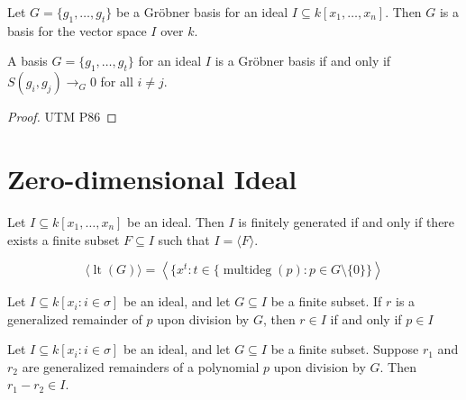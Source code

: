 \begin{lemma}\label{groebner_basis_is_basis}
  Let \( G = \{g_1, \ldots, g_t\} \) be a Gröbner basis for an ideal \( I \subseteq k[x_1, \ldots, x_n] \). Then \( G \) is a basis for the vector space \( I \) over \( k \).
\end{lemma}

\begin{lemma}\label{Buchberger Criteria}
A basis \( G = \{ g_1, \ldots, g_t \} \) for an ideal \( I \) is a Gröbner basis if and only if \( S(g_i, g_j) \to_G 0 \) for all \( i \neq j \).
\end{lemma}
\begin{proof}
 UTM P86
\end{proof}

\section{Zero-dimensional Ideal}\label{Zero-dimensional Ideal}
\begin{lemma}\label{fg_span_iff_fg_span_finset_subset}
  Let \( I \subseteq k[x_1, \ldots, x_n] \) be an ideal. Then \( I \) is finitely generated if and only if there exists a finite subset \( F \subseteq I \) such that \( I = \langle F \rangle \).
\end{lemma}

\begin{lemma}\label{leadingTerm_ideal_span_monomial}
  \leanok
  \[
  \langle \operatorname{lt}(G) \rangle = \left\langle \{ x^t : t \in \{ \operatorname{multideg}(p) : p \in G \setminus \{0\} \} \right\rangle
  \]
\end{lemma}

\begin{lemma}\label{remainder_mem_ideal_iff}
  Let \( I \subseteq k[x_i : i \in \sigma] \) be an ideal, and let \( G \subseteq I \) be a finite subset.
  If \( r \) is a generalized remainder of \( p \) upon division by \( G \),
  then \( r \in I \) if and only if \( p \in I \)
\end{lemma}

\begin{lemma}\label{remainder_sub_remainder_mem_ideal}
  Let \( I \subseteq k[x_i : i \in \sigma] \) be an ideal, and let \( G \subseteq I \) be a finite subset.
  Suppose \( r_1 \) and \( r_2 \) are generalized remainders of a polynomial \( p \) upon division by \( G \).
  Then \( r_1 - r_2 \in I \).
\end{lemma}

